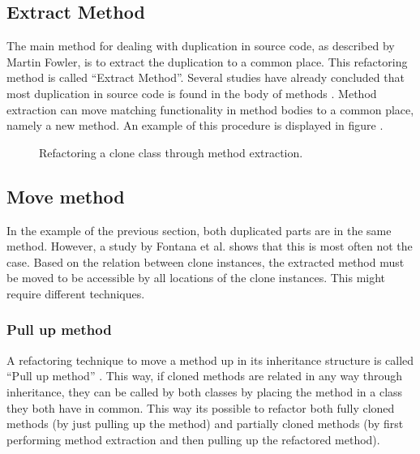 \subsection{Extract Method}
The main method for dealing with duplication in source code, as described by Martin Fowler, is to extract the duplication to a common place. This refactoring method is called ``Extract Method''. Several studies have already concluded that most duplication in source code is found in the body of methods \cite{lozano2007evaluating, white2016deep, bergman2004ethnographic}. Method extraction can move matching functionality in method bodies to a common place, namely a new method. An example of this procedure is displayed in figure \cite{fig:extractmethod}.

\begin{figure}[H]
\begin{parcolumns}{2}
\end{parcolumns}
\caption{Refactoring a clone class through method extraction.}
\label{fig:extractmethod}
\end{figure}

\subsection{Move method}
In the example of the previous section, both duplicated parts are in the same method. However, a study by Fontana et al. \cite{fontana2015duplicated} shows that this is most often not the case. Based on the relation between clone instances, the extracted method must be moved to be accessible by all locations of the clone instances. This might require different techniques.

\subsubsection{Pull up method}
A refactoring technique to move a method up in its inheritance structure is called ``Pull up method'' \cite{fowler2018refactoring}. This way, if cloned methods are related in any way through inheritance, they can be called by both classes by placing the method in a class they both have in common. This way its possible to refactor both fully cloned methods (by just pulling up the method) and partially cloned methods (by first performing method extraction and then pulling up the refactored method).

